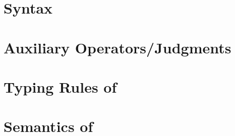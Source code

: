 \section{Syntax}


\section{Auxiliary Operators/Judgments}


\section{Typing Rules of \TLLC{}}


\section{Semantics of \TLLC{}}\label{appendix:semantics}
